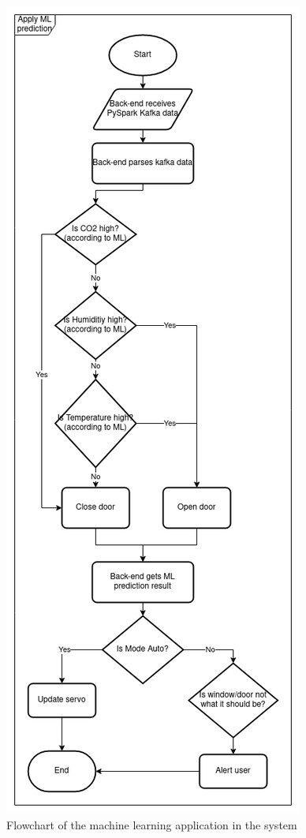 \begin{figure}
      \centering
      \includegraphics[scale=0.44]{resources/flowchart-apply-ml.png}
      \caption{Flowchart of the machine learning application in the system}
      \label{flowchart-apply-ml}
\end{figure}

